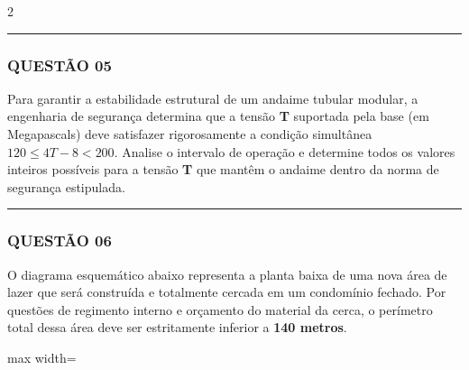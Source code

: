 \documentclass[twoside, 10pt, a4paper]{article}
\begin{document}
\begin{multicols*}{2}
\vspace{0cm} \noindent\textcolor{CorLinha}{\rule{\linewidth}{0.5pt}} \vspace{-0.2cm}
\subsubsection*{QUESTÃO 05}
Para garantir a estabilidade estrutural de um andaime tubular modular, a engenharia de segurança determina que a tensão \textbf{T} suportada pela base (em Megapascals) deve satisfazer rigorosamente a condição simultânea $ 120 \le 4T - 8 < 200 $. Analise o intervalo de operação e determine todos os valores inteiros possíveis para a tensão \textbf{T} que mantêm o andaime dentro da norma de segurança estipulada.

\vspace{0cm} \noindent\textcolor{CorLinha}{\rule{\linewidth}{0.5pt}} \vspace{-0.2cm}
\subsubsection*{QUESTÃO 06}
O diagrama esquemático abaixo representa a planta baixa de uma nova área de lazer que será construída e totalmente cercada em um condomínio fechado. Por questões de regimento interno e orçamento do material da cerca, o perímetro total dessa área deve ser estritamente inferior a \textbf{140 metros}.

\begin{center}
\begin{adjustbox}{max width=\linewidth}
\end{adjustbox}
\end{center}
\end{multicols*}
\end{document}
